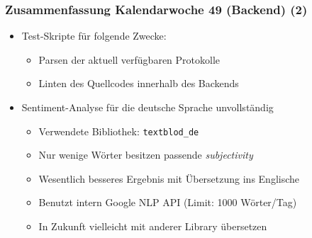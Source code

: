 \documentclass{beamer}
\newcommand{\cw}{49}
\begin{document}
  \begin{frame}
    \frametitle{Zusammenfassung Kalendarwoche \cw{} (Backend) (2)}
    \begin{itemize}
      \item Test-Skripte für folgende Zwecke:
      \begin{itemize}
        \item Parsen der aktuell verfügbaren Protokolle
        \item Linten des Quellcodes innerhalb des Backends
      \end{itemize}
      \item Sentiment-Analyse für die deutsche Sprache unvollständig
      \begin{itemize}
        \item Verwendete Bibliothek: \texttt{textblod\_de}
        \item Nur wenige Wörter besitzen passende \textit{subjectivity}
        \item Wesentlich besseres Ergebnis mit Übersetzung ins Englische
        \item Benutzt intern Google NLP API (Limit: 1000 Wörter/Tag)
        \item In Zukunft vielleicht mit anderer Library übersetzen
      \end{itemize}
    \end{itemize}
  \end{frame}
\end{document}
